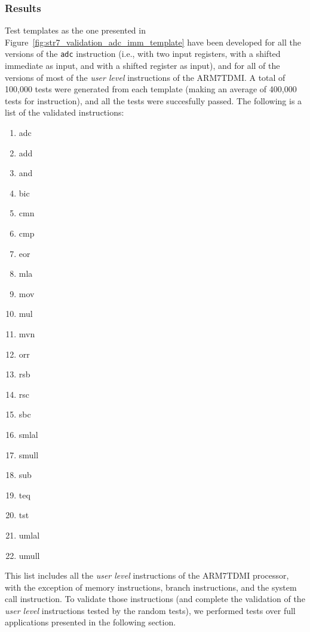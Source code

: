 \subsubsection{Results}

Test templates as the one presented in Figure~\ref{fig:str7_validation_adc_imm_template} have been developed for all the versions of the \texttt{adc} instruction (i.e., with two input registers, with a shifted immediate as input, and with a shifted register as input), and for all of the versions of most of the \textit{user level} instructions of the ARM7TDMI.
A total of 100,000 tests were generated from each template (making an average of 400,000 tests for instruction), and all the tests were succesfully passed. The following is a list of the validated instructions:
\begin{enumerate}
	\item adc
	\item add
	\item and
	\item bic
	\item cmn
	\item cmp
	\item eor
	\item mla
	\item mov
	\item mul
	\item mvn
	\item orr
	\item rsb
	\item rsc
	\item sbc
	\item smlal
	\item smull
	\item sub
	\item teq
	\item tst
	\item umlal
	\item umull
\end{enumerate}

This list includes all the \textit{user level} instructions of the ARM7TDMI processor, with the exception of memory instructions, branch instructions, and the system call instruction.
To validate those instructions (and complete the validation of the \textit{user level} instructions tested by the random tests), we performed tests over full applications presented in the following section.
